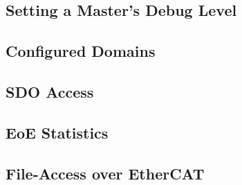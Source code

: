 \documentclass[a4paper,12pt,BCOR6mm,bibtotoc,idxtotoc]{scrbook}
\begin{document}

\subsection{Setting a Master's Debug Level}
\label{sec:ethercat-debug}




\subsection{Configured Domains}




\subsection{SDO Access}






\subsection{EoE Statistics}




\subsection{File-Access over EtherCAT}




\end{document}
